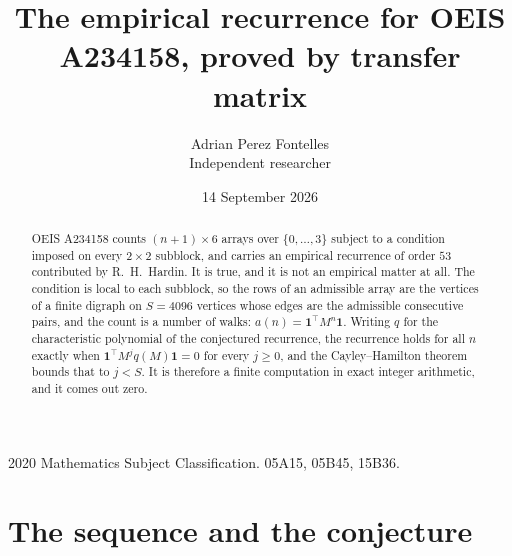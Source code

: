 \documentclass[11pt,a4paper]{article}
\title{The empirical recurrence for OEIS A234158, proved by transfer matrix}
\author{Adrian Perez Fontelles\\ \small Independent researcher}
\date{14 September 2026}
\theoremstyle{plain}
\theoremstyle{definition}
\begin{document}
\maketitle

\begin{abstract}
OEIS A234158 counts $(n+1)\times6$ arrays over $\{0,\dots,3\}$ subject to a condition imposed on
every $2\times2$ subblock, and carries an empirical recurrence of order $53$ contributed
by R.~H.~Hardin. It is true, and it is not an empirical matter at all. The condition is local
to each subblock, so the rows of an admissible array are the vertices of a finite digraph
on $S=4096$ vertices whose edges are the admissible consecutive pairs, and the count is a
number of walks: $a(n)=\mathbf{1}^{\!\top}M^{n}\mathbf{1}$. Writing $q$
for the characteristic polynomial of the conjectured recurrence, the recurrence holds for all
$n$ exactly when $\mathbf{1}^{\!\top}M^{j}q(M)\mathbf{1}=0$ for every $j\ge0$, and the
Cayley--Hamilton theorem bounds that to $j<S$. It is therefore a finite computation in exact
integer arithmetic, and it comes out zero.
\end{abstract}

\noindent\small 2020 Mathematics Subject Classification. 05A15, 05B45, 15B36.\normalsize

\section{The sequence and the conjecture}
\end{document}
